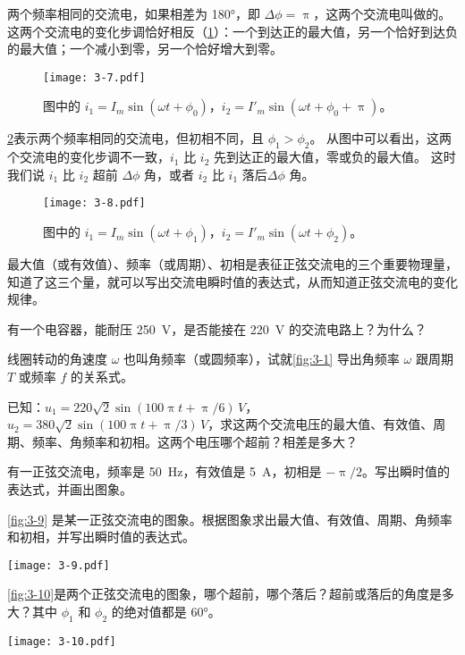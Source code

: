 两个频率相同的交流电，如果相差为 \ang{180}，即 $\Delta\phi=\uppi$，这两个交流电叫做的。
这两个交流电的变化步调恰好相反（\cref{fig:3-7}）：一个到达正的最大值，另一个恰好到达负的最大值；一个减小到零，另一个恰好增大到零。
\begin{figure}
  \texttt{[image: 3-7.pdf]}
\caption{图中的 $i_1=I_m\sin(\omega t+\phi_0)$，$i_2=I'_m\sin(\omega t+\phi_0+\uppi)$。}\label{fig:3-7}
\end{figure}

\cref{fig:3-8}表示两个频率相同的交流电，但初相不同，且 $\phi_1>\phi_2$。
从图中可以看出，这两个交流电的变化步调不一致，$i_1$ 比 $i_2$ 先到达正的最大值，零或负的最大值。
这时我们说 $i_1$ 比 $i_2$ 超前 $\Delta\phi$ 角，或者 $i_2$ 比 $i_1$ 落后$\Delta\phi$ 角。
\begin{figure}
  \texttt{[image: 3-8.pdf]}
\caption{图中的 $i_1=I_m\sin(\omega t+\phi_1)$，$i_2=I'_m\sin(\omega t+\phi_2)$。}\label{fig:3-8}
\end{figure}

最大值（或有效值）、频率（或周期）、初相是表征正弦交流电的三个重要物理量，知道了这三个量，就可以写出交流电瞬时值的表达式，从而知道正弦交流电的变化规律。

\begin{Practice}
\begin{question}
  \item 有一个电容器，能耐压 \qty{250}{V}，是否能接在 \qty{220}{V} 的交流电路上？为什么？
  \item 线圈转动的角速度 $\omega$ 也叫角频率（或圆频率），试就\cref{fig:3-1} 导出角频率 $\omega$ 跟周期 $T$ 或频率 $f$ 的关系式。
  \item 已知：$u_1=220\sqrt{2}\sin(100\uppi t+\uppi /6)\,\unit{V}$，$u_2=380\sqrt{2}\sin(100\uppi t+\uppi /3)\,\unit{V}$，求这两个交流电压的最大值、有效值、周期、频率、角频率和初相。这两个电压哪个超前？相差是多大？
  \item 有一正弦交流电，频率是 \qty{50}{Hz}，有效值是 \qty{5}{A}，初相是 $-\uppi/2$。写出瞬时值的表达式，并画出图象。
  \item \cref{fig:3-9} 是某一正弦交流电的图象。根据图象求出最大值、有效值、周期、角频率和初相，并写出瞬时值的表达式。
  \begin{figurehere}
    \begin{minipage}{\linewidth}\centering
      \texttt{[image: 3-9.pdf]}
      \caption{}\label{fig:3-9}
    \end{minipage}
  \end{figurehere}
  \item \cref{fig:3-10}是两个正弦交流电的图象，哪个超前，哪个落后？超前或落后的角度是多大？其中 $\phi_1$ 和 $\phi_2$ 的绝对值都是 \ang{60}。
  \begin{figurehere}
    \begin{minipage}{\linewidth}\centering
      \texttt{[image: 3-10.pdf]}
      \caption{}\label{fig:3-10}
    \end{minipage}
  \end{figurehere}
\end{question}
\end{Practice}

